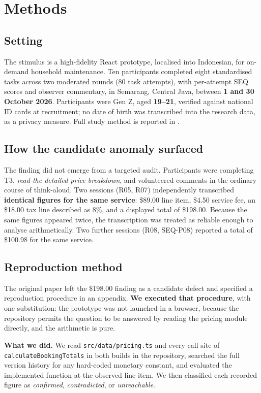 \documentclass[conference]{IEEEtran}
\begin{document}
\section{Methods}

\subsection{Setting}

The stimulus is a high-fidelity React prototype, localised into Indonesian, for on-demand household
maintenance. Ten participants completed eight standardised tasks across two moderated rounds (80 task
attempts), with per-attempt SEQ scores and observer commentary, in Semarang, Central Java, between
\textbf{1 and 30 October 2026}. Participants were Gen Z, aged \textbf{19--21}, verified against national
ID cards at recruitment; no date of birth was transcribed into the research data, as a privacy measure.
Full study method is reported in \cite{braniwati2026dispersion}.

\subsection{How the candidate anomaly surfaced}

The finding did not emerge from a targeted audit. Participants were completing T3, \emph{read the
detailed price breakdown}, and volunteered comments in the ordinary course of think-aloud. Two sessions
(R05, R07) independently transcribed \textbf{identical figures for the same service}: \$89.00 line item,
\$4.50 service fee, an \$18.00 tax line described as 8\%, and a displayed total of \$198.00. Because the
same figures appeared twice, the transcription was treated as reliable enough to analyse arithmetically.
Two further sessions (R08, SEQ-P08) reported a total of \$100.98 for the same service.

\subsection{Reproduction method}

The original paper left the \$198.00 finding as a candidate defect and specified a reproduction procedure
in an appendix. \textbf{We executed that procedure}, with one substitution: the prototype was not launched
in a browser, because the repository permits the question to be answered by reading the pricing module
directly, and the arithmetic is pure.

\textbf{What we did.} We read \texttt{src/data/pricing.ts} and every call site of
\texttt{calculateBookingTotals} in both builds in the repository, searched the full version history for
any hard-coded monetary constant, and evaluated the implemented function at the observed line item. We
then classified each recorded figure as \emph{confirmed}, \emph{contradicted}, or \emph{unreachable}.
\end{document}
